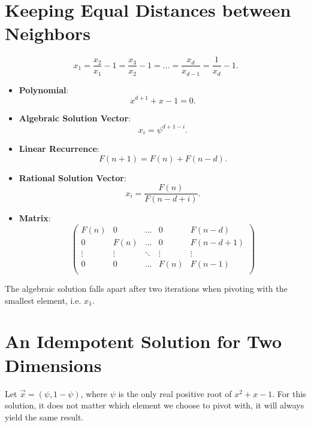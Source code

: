 \documentclass[english,version-2020-11]{uzl-thesis}
\begin{document}

\section{Keeping Equal Distances between Neighbors}

\[
  x_1 = \frac{x_2}{x_1} - 1 = \frac{x_3}{x_2} - 1 = \dots = \frac{x_d}{x_{d-1}} = \frac{1}{x_d} - 1.
\]

\begin{itemize}
  \item \textbf{Polynomial}: \[x^{d+1} + x - 1 = 0.\]
  \item \textbf{Algebraic Solution Vector}: \[x_i = \psi^{d+1-i}.\]
  \item \textbf{Linear Recurrence}: \[F(n + 1) = F(n) + F(n - d).\]
  \item \textbf{Rational Solution Vector}: \[x_i = \frac{F(n)}{F(n-d+i)}.\]
  \item \textbf{Matrix}:
    \[\left(\begin{array}{cccc|c}
      F(n)   & 0      & \dots  & 0      & F(n - d) \\
        0    & F(n)   & \dots  & 0      & F(n - d + 1) \\
      \vdots & \vdots & \ddots & \vdots & \vdots   \\
        0    & 0      & \dots  & F(n)   & F(n - 1) \\
    \end{array}\right)\]
\end{itemize}

The algebraic solution falls apart after two iterations when pivoting with the
smallest element, i.e. $x_1$.

\section{An Idempotent Solution for Two Dimensions}

Let $\vec x = (\psi, 1 - \psi)$, where $\psi$ is the only real positive root of $x^2 + x - 1$.
For this solution, it does not matter which element we choose to pivot with, it will always
yield the same result.
\end{document}
